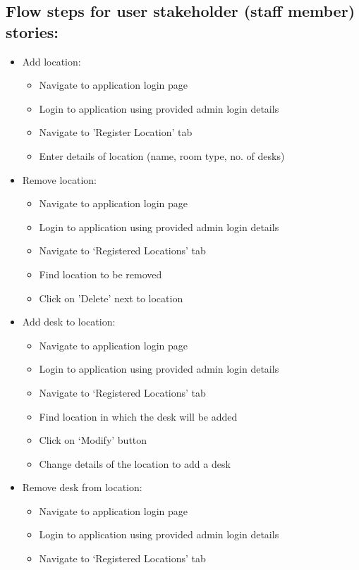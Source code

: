 \documentclass[11pt,a4paper]{article}
\begin{document}
\subsection{Flow steps for user stakeholder (staff member) stories:}
\begin{itemize}
  \item Add location:
    \begin{itemize}
      \item Navigate to application login page
      \item Login to application using provided admin login details
      \item Navigate to 'Register Location' tab
      \item Enter details of location (name, room type, no. of desks)
    \end{itemize}
  \item Remove location:
    \begin{itemize}
      \item Navigate to application login page
      \item Login to application using provided admin login details
      \item Navigate to ‘Registered Locations’ tab
      \item Find location to be removed
      \item Click on 'Delete' next to location
    \end{itemize}
  \item Add desk to location:
    \begin{itemize}
      \item Navigate to application login page
      \item Login to application using provided admin login details
      \item Navigate to ‘Registered Locations’ tab
      \item Find location in which the desk will be added
      \item Click on ‘Modify' button
      \item Change details of the location to add a desk
    \end{itemize}
  \item Remove desk from location:
    \begin{itemize}
      \item Navigate to application login page
      \item Login to application using provided admin login details
      \item Navigate to ‘Registered Locations’ tab

\end{itemize}
\end{itemize}
\end{document}
